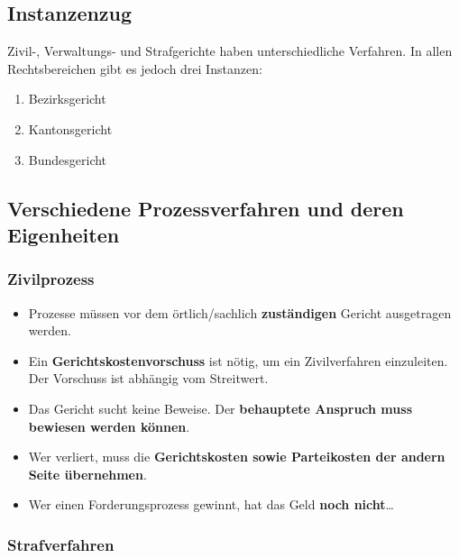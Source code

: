 \subsection{Instanzenzug}

Zivil-, Verwaltungs- und Strafgerichte haben unterschiedliche
Verfahren. In allen Rechtsbereichen gibt es jedoch drei Instanzen:

\begin{enumerate}
	\tightlist
	\item Bezirksgericht
	\item Kantonsgericht
	\item Bundesgericht
\end{enumerate}

\subsection{Verschiedene Prozessverfahren und deren Eigenheiten}

\subsubsection{Zivilprozess}

\begin{itemize}
\tightlist
\item Prozesse müssen vor dem örtlich/sachlich \textbf{zuständigen} Gericht
  ausgetragen werden.
\item Ein \textbf{Gerichtskostenvorschuss} ist nötig, um ein Zivilverfahren
  einzuleiten. Der Vorschuss ist abhängig vom Streitwert.
\item Das Gericht sucht keine Beweise. Der \textbf{behauptete Anspruch muss
  bewiesen werden können}.
\item Wer verliert, muss die \textbf{Gerichtskosten sowie Parteikosten der
  andern Seite übernehmen}.
\item Wer einen Forderungsprozess gewinnt, hat das Geld \textbf{noch
  nicht}\ldots{}
\end{itemize}


\subsubsection{Strafverfahren}

